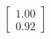 \documentclass[preview]{standalone}
\begin{document}
\begin{align*}
\begin{bmatrix} 1.00 \\ 0.92 \end{bmatrix}
\end{align*}
\end{document}
